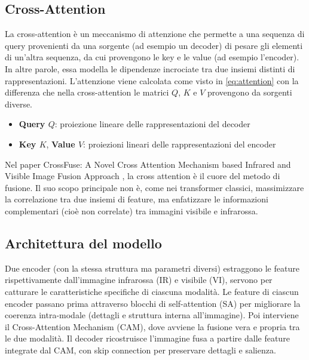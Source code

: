 \subsection{Cross-Attention}
La cross-attention \cite{vaswani2023attentionneed} è un meccanismo di attenzione che permette a una sequenza di query provenienti da una sorgente 
(ad esempio un decoder) di pesare gli elementi di un’altra sequenza, da cui provengono le key e le value (ad esempio l’encoder).
In altre parole, essa modella le dipendenze incrociate tra due insiemi distinti di rappresentazioni.
L'attenzione viene calcolata come visto in \ref{eq:attention} con la differenza che nella cross-attention 
le matrici \(Q\), \(K\) e \(V\) provengono da sorgenti diverse. 
\begin{itemize}
  \item \textbf{Query \(Q\)}: proiezione lineare delle rappresentazioni del decoder
  \item \textbf{Key \(K\)}, \textbf{Value \(V\)}: proiezioni lineari delle rappresentazioni del encoder
\end{itemize}
Nel paper CrossFuse: A Novel Cross Attention Mechanism based Infrared and Visible Image Fusion Approach \cite{li2024crossfuse}, 
la cross attention è il cuore del metodo di fusione. Il suo scopo principale non è, come nei transformer 
classici, massimizzare la correlazione tra due insiemi di feature, ma enfatizzare le informazioni complementari 
(cioè non correlate) tra immagini visibile e infrarossa.

\subsection{Architettura del modello}
Due encoder (con la stessa struttura ma parametri diversi) estraggono le feature rispettivamente dall’immagine infrarossa (IR) e visibile (VI), 
servono per catturare le caratteristiche specifiche di ciascuna modalità. Le feature di ciascun encoder passano prima attraverso blocchi di 
self-attention (SA) per migliorare la coerenza intra-modale (dettagli e struttura interna all’immagine).
Poi interviene il Cross-Attention Mechanism (CAM), dove avviene la fusione vera e propria tra le due modalità.
Il decoder ricostruisce l’immagine fusa a partire dalle feature integrate dal CAM, con skip connection per preservare dettagli e salienza.
